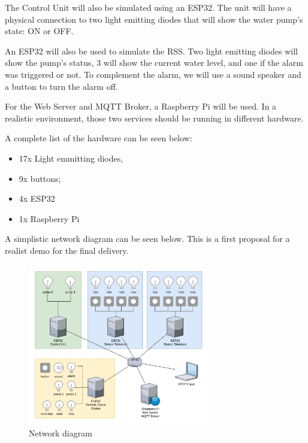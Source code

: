 \documentclass[11pt]{article}
\begin{document}
The Control Unit will also be simulated using an ESP32. The unit will have a physical connection to two light emitting diodes that will show the water pump's state: ON or OFF.

An ESP32 will also be used to simulate the RSS. Two light emitting diodes will show the pump's status, 3 will show the current water level, and one if the alarm was triggered or not. To complement the alarm, we will use a sound speaker and a button to turn the alarm off.

For the Web Server and MQTT Broker, a Raspberry Pi will be used. In a realistic environment, those two services should be running in different hardware.

A complete list of the hardware can be seen below:

\begin{itemize}
	\item 17x Light emmitting diodes,
	\item 9x buttons;
	\item 4x ESP32
	\item 1x Raspberry Pi
\end{itemize}

A simplistic network diagram can be seen below. This is a first proposal for a realist demo for the final delivery.

\begin{figure}[H]
  \centering
  \includegraphics[width=300px]{../diagrams/network-diagram-WPS.jpg}
  \caption{Network diagram}
  \label{fig:Network1 Diagram}
\end{figure}
\end{document}
